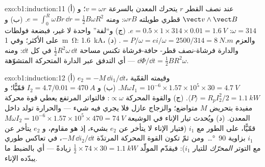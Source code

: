 \begin{solution}{exo:b1:induction:11}
(أ) عند نصف القطر $r$ يتحرك المعدن بالسرعة $v = \omega r$؛ و $\vect v\wedge\vect B$
قطري طويلته $\omega rB$: ومنه $e = \int_0^R\omega Br\,\dd r = \tfrac12B\omega R^2$.
(ب) و $\omega = 314$: $e = 0.5 \times 1 \times 314 \times 0.01 = \qty{1.6}{V}$. (ج) و``لفة''
واحدة لا غير، فبضعة فولطات على الأكثر؛ وفي \qty{1}{m\ohm}: \qty{1.6}{kA}، والعزم
$= P/\omega = ei/\omega = 2500/314 = \qty{8}{N.m}$. (د) والدارة فرشاة-نصف قطر-
حافة-فرشاة تكنس مساحة $\tfrac12R^2\omega\,\dd t$ في كل $\dd t$: ومنه $\dd\Phi/\dd t =
\tfrac12BR^2\omega$ --- أي التدفق عبر الدارة المتحركة المتشوّهة.
\end{solution}

\begin{solution}{exo:b1:induction:12}
(أ) $e_2 = -M\,\dd i_1/\dd t$، وقيمته القمّية $M\omega I_1 = 10^{-6} \times 1.57 \times 10^5 \times 30 =
\qty{4.7}{V}$. (ب) و $I_2 = 4.7/0.01 = \qty{470}{A}$ قمّيًّا؛ و $\langle P\rangle = R_pI_2^2/2
= \qty{1.1}{kW}$. (ج) والقوة المحركة $\propto\omega$: فالتواتر المرتفع يعطي قوة محركة
مفيدة بتحريض $M$ متواضع؛ والزجاج عازل فلا يجري فيه شيء
--- والحرارة تولد داخل المعدن. (د) ويُحدث تيار الإناء في
الوشيعة $M\omega I_2 = 10^{-6} \times 1.57 \times 10^5 \times 470 = \qty{74}{V}$ قمّيًّا،
على الطور مع $i_1$ (فتيار الإناء لا يتأخر عن $e_2$ بشيء، إذ هو
مقاوم، و $e_2$ يتأخر عن $i_1$ بزاوية \qty{90}{\degree}\ldots\ ومن ثمّ تكون
القوة المحركة المرتدّة $-M\,\dd i_2/\dd t$، في تعاكس طوري مع التوتر
\emph{المحرّك} للتيار $i_1$): فيقدّم المولّد $\tfrac12 \times 74 \times 30 =
\qty{1.1}{kW}$ زيادةً --- أي بالضبط ما يبدّده الإناء.
\end{solution}

